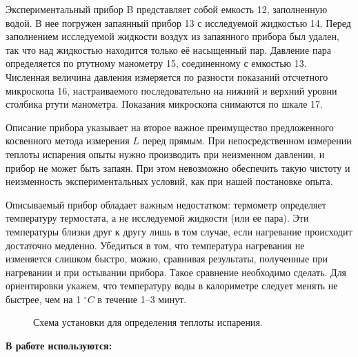 \documentclass[a4paper, 12pt]{article}%
\begin{document}
	Экспериментальный прибор B представляет собой емкость 12, заполненную водой. В нее погружен запаянный прибор 13 с исследуемой жидкостью 14. Перед заполнением исследуемой жидкости воздух из запаянного прибора был удален, так что над жидкостью находится только её насыщенный пар. Давление пара определяется по ртутному манометру 15, соединенному с емкостью 13. Численная величина давления измеряется по разности показаний отсчетного микроскопа 16, настраиваемого последовательно на нижний и верхний уровни столбика ртути манометра. Показания микроскопа снимаются по шкале 17.
	
	Описание прибора указывает на второе важное преимущество предложенного косвенного метода измерения $ L $ перед прямым. При непосредственном измерении теплоты испарения опыты нужно производить при неизменном давлении, и прибор не может быть запаян. При этом невозможно обеспечить такую чистоту и неизменность экспериментальных условий, как при нашей постановке опыта.
	
	Описываемый прибор обладает важным недостатком: термометр определяет температуру термостата, а не исследуемой жидкости (или ее пара). Эти температуры близки друг к другу лишь в том случае, если нагревание происходит достаточно медленно. Убедиться в том, что температура нагревания не изменяется слишком быстро, можно, сравнивая результаты, полученные при нагревании и при остывании прибора. Такое сравнение необходимо сделать. Для ориентировки укажем, что температуру воды в калориметре следует менять не быстрее, чем на 1 $ ^\circ C $ в течение 1–3 минут.
	\begin{figure}[H]
		\caption{Схема установки для определения теплоты испарения.}
	\end{figure}
	
	\textbf{В работе используются:}\\
	
\end{document}
